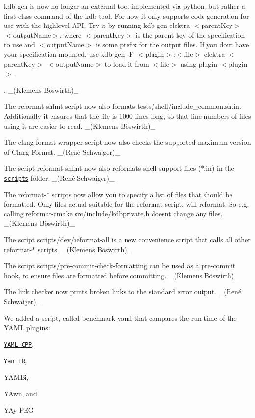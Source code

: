 {\ttfamily kdb gen} is now no longer an external tool implemented via python, but rather a first class command of the {\ttfamily kdb} tool. For now it only supports code generation for use with the highlevel A\+PI. Try it by running {\ttfamily kdb gen elektra $<$parent\+Key$>$ $<$output\+Name$>$}, where {\ttfamily $<$parent\+Key$>$} is the parent key of the specification to use and {\ttfamily $<$output\+Name$>$} is some prefix for the output files. If you don\textquotesingle{}t have your specification mounted, use {\ttfamily kdb gen -\/F $<$plugin$>$\+:$<$file$>$ elektra $<$parent\+Key$>$ $<$output\+Name$>$} to load it from {\ttfamily $<$file$>$} using plugin {\ttfamily $<$plugin$>$}.

. \+\_\+(Klemens Böswirth)\+\_\+


\begin{DoxyItemize}
\item The {\ttfamily reformat-\/shfmt} script now also formats {\ttfamily tests/shell/include\+\_\+common.\+sh.\+in}. Additionally it ensures that the file is 1000 lines long, so that line numbers of files using it are easier to read. \+\_\+(Klemens Böswirth)\+\_\+
\item The clang-\/format wrapper script now also checks the supported maximum version of Clang-\/\+Format. \+\_\+(René Schwaiger)\+\_\+
\item The script {\ttfamily reformat-\/shfmt} now also reformats shell support files ({\ttfamily $\ast$.in}) in the \href{https://master.libelektra.org/scripts}{\tt {\ttfamily scripts}} folder. \+\_\+(René Schwaiger)\+\_\+
\item The {\ttfamily reformat-\/$\ast$} scripts now allow you to specify a list of files that should be formatted. Only files actual suitable for the reformat script, will reformat. So e.\+g. calling {\ttfamily reformat-\/cmake \hyperlink{kdbprivate_8h}{src/include/kdbprivate.\+h}} doesn\textquotesingle{}t change any files. \+\_\+(Klemens Böswirth)\+\_\+
\item The script {\ttfamily scripts/dev/reformat-\/all} is a new convenience script that calls all other {\ttfamily reformat-\/$\ast$} scripts. \+\_\+(Klemens Böswirth)\+\_\+
\item The script {\ttfamily scripts/pre-\/commit-\/check-\/formatting} can be used as a pre-\/commit hook, to ensure files are formatted before committing. \+\_\+(Klemens Böswirth)\+\_\+
\item The link checker now prints broken links to the standard error output. \+\_\+(René Schwaiger)\+\_\+
\item We added a script, called {\ttfamily benchmark-\/yaml} that compares the run-\/time of the Y\+A\+ML plugins\+:
\begin{DoxyItemize}
\item \href{https://www.libelektra.org/plugins/yamlcpp}{\tt Y\+A\+ML C\+PP},
\item \href{https://www.libelektra.org/plugins/yanlr}{\tt Yan LR},
\item Y\+A\+M\+Bi,
\item Y\+Awn, and
\item Y\+Ay P\+EG
\end{DoxyItemize}


\end{DoxyItemize}
